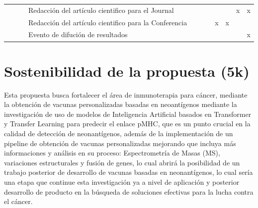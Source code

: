\documentclass[a4paper,11pt]{article}
\begin{document}
\begin{table}[H]
\begin{tabular}{p{0.6cm}p{0.6cm}p{6cm}p{4cm}p{1cm}cccccc}
		&                       &                                                                                                                                                                                                                                                                                            & Redacción del artículo cientifico para el Journal                                                    &                    &                       &                        & \multicolumn{1}{l}{} & \multicolumn{1}{l}{} & \multicolumn{1}{c}{x} & \multicolumn{1}{c}{x}  \\
		&                       &                                                                                                                                                                                                                                                                                            & Redacción del artículo cientifico para la Conferencia                                                &                    &                       &                        & x                    & x                    &                       &                        \\
		&                       &                                                                                                                                                                                                                                                                                            & Evento de difución de resultados                                                                     &                    &                       &                        & \multicolumn{1}{l}{} & \multicolumn{1}{l}{} &                       & \multicolumn{1}{c}{x}  \\  \hline
		
		
	\end{tabular}
\end{table}




\section{Sostenibilidad de la propuesta (5k)}

Esta propuesta busca fortalecer el área de inmunoterapia para cáncer, mediante la obtención de vacunas personalizadas basadas en neoantígenos mediante la investigación de uso de modelos de Inteligencia Artificial basados en Transformer y Transfer Learning para predecir el enlace pMHC, que es un punto crucial en la calidad de detección de neonantígenos, además de la implementación de un pipeline de obtención de vacunas personalizadas mejorando que incluya más informaciones y análisis en su proceso: Espectrometría de Masas (MS), variaciones estructurales y fusión de genes, lo cual abrirá la posibilidad de un trabajo posterior de desarrollo de vacunas basadas en neonantígenos, lo cual sería una etapa que continue esta investigación ya a nivel de aplicación y posterior desarrollo de producto en la búsqueda de soluciones efectivas para la lucha contra el cáncer.
\end{document}
